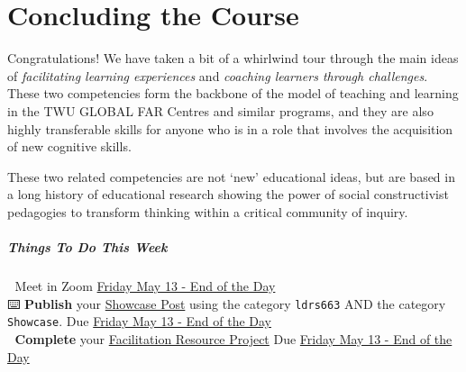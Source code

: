 \documentclass[
]{book}
\begin{document}
\hypertarget{concluding-the-course}{%
\chapter{Concluding the Course}\label{concluding-the-course}}

Congratulations! We have taken a bit of a whirlwind tour through the main ideas of \emph{facilitating learning experiences} and \emph{coaching learners through challenges}. These two competencies form the backbone of the model of teaching and learning in the TWU GLOBAL FAR Centres and similar programs, and they are also highly transferable skills for anyone who is in a role that involves the acquisition of new cognitive skills.

These two related competencies are not `new' educational ideas, but are based in a long history of educational research showing the power of social constructivist pedagogies to transform thinking within a critical community of inquiry.

\begin{todo}
\hypertarget{things-to-do-this-week}{%
\paragraph{Things To Do This Week}\label{things-to-do-this-week}}

👥 Meet in Zoom
\href{https://www.timeanddate.com/worldclock/fixedtime.html?msg=LDRS663+Meeting\&iso=20220506T2359\&p1=256\&ah=1\&am=30\&p1=1109}{Friday
May 13 - End of the Day}\\
⌨️ \textbf{Publish} your
\href{https://ma-lead.github.io/ldrs663/assessments.html\#showcase-post}{Showcase
Post} using the category \texttt{ldrs663} AND the category
\texttt{Showcase}. Due
\href{https://www.timeanddate.com/worldclock/fixedtime.html?msg=LDRS663+Meeting\&iso=20220506T2359\&p1=256\&ah=1\&am=30\&p1=1109}{Friday
May 13 - End of the Day}\\
👥 \textbf{Complete} your
\href{https://ma-lead.github.io/ldrs663/assessments.html\#facilitation-resource-project-40}{Facilitation
Resource Project} Due
\href{https://www.timeanddate.com/worldclock/fixedtime.html?msg=LDRS663+Meeting\&iso=20220506T2359\&p1=256\&ah=1\&am=30\&p1=1109}{Friday
May 13 - End of the Day}
\end{todo}

  
\end{document}

